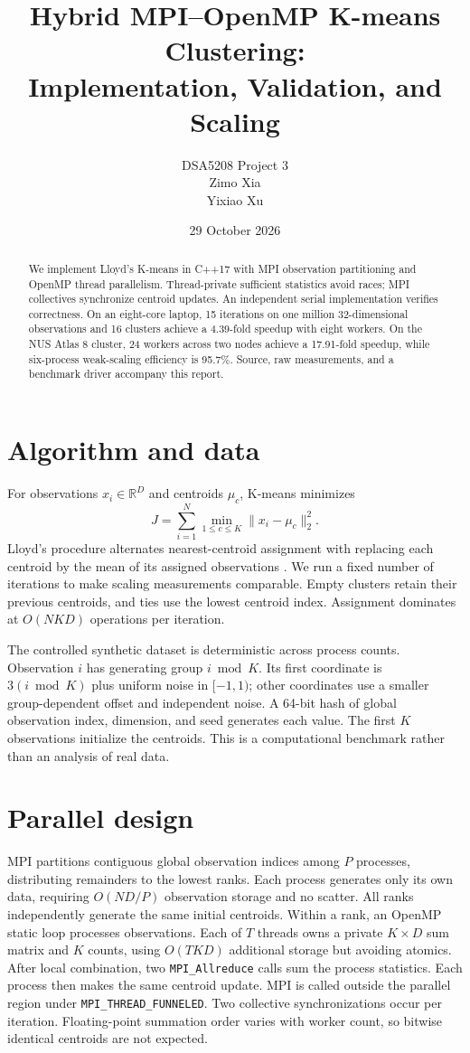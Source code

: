 \documentclass[9pt,a4paper]{extarticle}
\title{Hybrid MPI--OpenMP K-means Clustering:\\Implementation, Validation, and Scaling}
\author{DSA5208 Project 3\\[0.5em]Zimo Xia\\Yixiao Xu}
\date{29 October 2026}
\begin{document}
\maketitle
\begin{abstract}
We implement Lloyd's K-means in C++17 with MPI observation partitioning and OpenMP thread parallelism. Thread-private sufficient statistics avoid races; MPI collectives synchronize centroid updates. An independent serial implementation verifies correctness. On an eight-core laptop, 15 iterations on one million 32-dimensional observations and 16 clusters achieve a 4.39-fold speedup with eight workers. On the NUS Atlas 8 cluster, 24 workers across two nodes achieve a 17.91-fold speedup, while six-process weak-scaling efficiency is 95.7\%. Source, raw measurements, and a benchmark driver accompany this report.
\end{abstract}

\section{Algorithm and data}
For observations $x_i\in\mathbb{R}^D$ and centroids $\mu_c$, K-means minimizes
\begin{equation}
J=\sum_{i=1}^{N}\min_{1\leq c\leq K}\lVert x_i-\mu_c\rVert_2^2.
\end{equation}
Lloyd's procedure alternates nearest-centroid assignment with replacing each centroid by the mean of its assigned observations \cite{lloyd}. We run a fixed number of iterations to make scaling measurements comparable. Empty clusters retain their previous centroids, and ties use the lowest centroid index. Assignment dominates at $O(NKD)$ operations per iteration.

The controlled synthetic dataset is deterministic across process counts. Observation $i$ has generating group $i\bmod K$. Its first coordinate is $3(i\bmod K)$ plus uniform noise in $[-1,1)$; other coordinates use a smaller group-dependent offset and independent noise. A 64-bit hash of global observation index, dimension, and seed generates each value. The first $K$ observations initialize the centroids. This is a computational benchmark rather than an analysis of real data.

\section{Parallel design}
MPI partitions contiguous global observation indices among $P$ processes, distributing remainders to the lowest ranks. Each process generates only its own data, requiring $O(ND/P)$ observation storage and no scatter. All ranks independently generate the same initial centroids. Within a rank, an OpenMP static loop processes observations. Each of $T$ threads owns a private $K\times D$ sum matrix and $K$ counts, using $O(TKD)$ additional storage but avoiding atomics. After local combination, two \texttt{MPI\_Allreduce} calls sum the process statistics. Each process then makes the same centroid update. MPI is called outside the parallel region under \texttt{MPI\_THREAD\_FUNNELED}. Two collective synchronizations occur per iteration. Floating-point summation order varies with worker count, so bitwise identical centroids are not expected.
\end{document}
